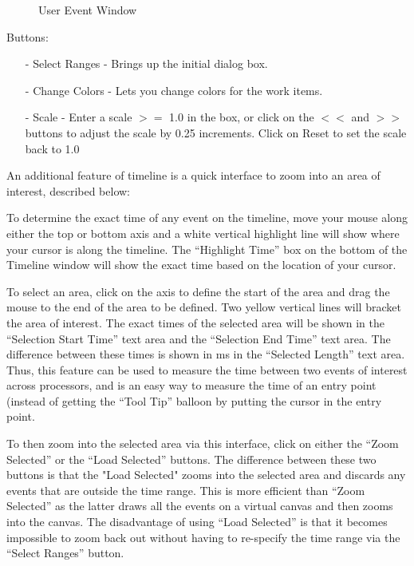 \documentclass[10pt,dvips]{article}
\begin{document}
\begin{enumerate}
\begin{itemize}
   \begin{figure}[htb]
   \center
   \caption{User Event Window}
   \label{userevent}
   \end{figure}

   \end{itemize}

Buttons:
   \begin{itemize}
   \item[-]
   Select Ranges - Brings up the initial dialog box.
   \item[-]
   Change Colors - Lets you change colors for the work items.
   \item[-]
   Scale - Enter a scale $>=$ 1.0 in the box, or click on the $<<$ and
   $>>$ buttons to adjust the scale by 0.25 increments.  Click on
   Reset to set the scale back to 1.0
   \end{itemize}
\end{enumerate}

An additional feature of timeline is a quick interface to zoom into an
area of interest, described below:

To determine the exact time of any event on the timeline, move your
mouse along either the top or bottom axis and a white vertical
highlight line will show where your cursor is along the timeline. The
``Highlight Time'' box on the bottom of the Timeline window will show
the exact time based on the location of your cursor.

To select an area, click on the axis to define the start of the area
and drag the mouse to the end of the area to be defined.  Two yellow
vertical lines will bracket the area of interest.  The exact times of
the selected area will be shown in the ``Selection Start Time'' text
area and the ``Selection End Time'' text area.  The difference between
these times is shown in ms in the ``Selected Length'' text area.  Thus,
this feature can be used to measure the time between two events of
interest across processors, and is an easy way to measure the time of
an entry point (instead of getting the ``Tool Tip'' balloon by putting
the cursor in the entry point.

To then zoom into the selected area via this interface, click on
either the ``Zoom Selected'' or the ``Load Selected'' buttons.  The
difference between these two buttons is that the "Load Selected" zooms
into the selected area and discards any events that are outside the
time range.  This is more efficient than ``Zoom Selected'' as the
latter draws all the events on a virtual canvas and then zooms into
the canvas. The disadvantage of using ``Load Selected'' is that it
becomes impossible to zoom back out without having to re-specify the
time range via the ``Select Ranges'' button.
\end{document}
